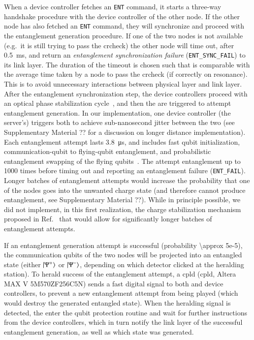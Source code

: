 When a device controller fetches an \texttt{ENT} command, it starts a three-way handshake procedure
with the device controller of the other node. If the other node has also fetched an \texttt{ENT}
command, they will synchronize and proceed with the entanglement generation procedure. If one of the
two nodes is not available (e.g.~it is still trying to pass the \acrshort{crcheck}) the other node
will time out, after \qty{0.5}{\ms}, and return an \emph{entanglement synchronization failure}
(\texttt{ENT\_SYNC\_FAIL}) to its link layer. The duration of the timeout is chosen such that is
comparable with the average time taken by a node to pass the \acrlong{crcheck} (if correctly on
resonance). This is to avoid unnecessary interactions between physical layer and link layer. After
the entanglement synchronization step, the device controllers proceed with an optical phase
stabilization cycle~\cite{pompili_2021_multinode}, and then the  are triggered to
attempt entanglement generation. In our implementation, one device controller (the server's)
triggers both  to achieve sub-nanosecond jitter between the two 
(see Supplementary Material ?? for a discussion on longer distance implementation). Each
entanglement attempt lasts \qty{3.8}{\us}, and includes fast qubit initialization,
communication-qubit to flying-qubit entanglement, and probabilistic entanglement swapping of the
flying qubits~\cite{pompili_2021_multinode}. The  attempt entanglement up to
\num{1000} times before timing out and reporting an {entanglement failure} (\texttt{ENT\_FAIL}).
Longer batches of entanglement attempts would increase the probability that one of the nodes goes
into the unwanted charge state (and therefore cannot produce entanglement, see Supplementary
Material ??). While in principle possible, we did not implement, in this first realization, the
charge stabilization mechanism proposed in Ref.~\cite{humphreys_2018_delivery} that would allow for
significantly longer batches of entanglement attempts.

If an entanglement generation attempt is successful (probability \num{\approx 5e-5}), the
communication qubits of the two nodes will be projected into an entangled state (either
$\ket{\Psi^+}$ or $\ket{\Psi^-}$, depending on which detector clicked at the heralding station). To
herald success of the entanglement attempt, a \acrshort{cpld} (\acrlong{cpld}, Altera MAX V
5M570ZF256C5N) sends a fast digital signal to both  and device controllers, to
prevent a new entanglement attempt from being played (which would destroy the generated entangled
state). When the heralding signal is detected, the  enter the qubit protection
routine and wait for further instructions from the device controllers, which in turn notify the link
layer of the successful entanglement generation, as well as which state was generated.

